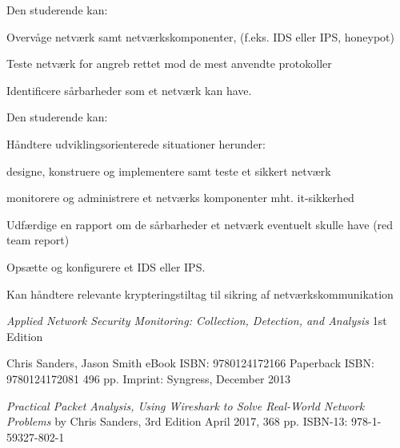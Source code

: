 \documentclass[Screen16to9,17pt]{foils}
\begin{document}

Den studerende kan:
\begin{list2}
\item Overvåge netværk samt netværkskomponenter, (f.eks. IDS eller IPS, honeypot)
\item Teste netværk for angreb rettet mod de mest anvendte protokoller
\item Identificere sårbarheder som et netværk kan have.
\end{list2}


Den studerende kan:

Håndtere udviklingsorienterede situationer herunder:
\begin{list2}
\item designe, konstruere og implementere samt teste et sikkert netværk
\item monitorere og administrere et netværks komponenter mht. it-sikkerhed
\item Udfærdige en rapport om de sårbarheder et netværk eventuelt skulle have (red
team report)
\item Opsætte og konfigurere et IDS eller IPS.
\end{list2}

Kan håndtere relevante krypteringstiltag til sikring af netværkskommunikation




\emph{Applied Network Security Monitoring: Collection, Detection, and Analysis}
1st Edition

Chris Sanders, Jason Smith
eBook ISBN: 9780124172166
Paperback ISBN: 9780124172081 496 pp.
Imprint: Syngress, December 2013

{\footnotesize{}}


\emph{Practical Packet Analysis,
Using Wireshark to Solve Real-World Network Problems}
by Chris Sanders, 3rd Edition
April 2017, 368 pp.
ISBN-13:
978-1-59327-802-1

\end{document}
